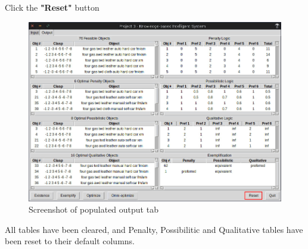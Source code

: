 \documentclass[12pt]{report}
\begin{document}
\begin{description}[leftmargin=4em]
\item [Step 1:]  Click the \textbf{"Reset"} button
\end{description}
\begin{figure}[H]
\begin{center}
\includegraphics[scale=0.3,trim=1cm 1cm 1cm 1cm]{reset}
\caption{Screenshot of populated output tab}
\end{center}
\end{figure}
\vspace{-2.5em}
\begin{description}[leftmargin=4em]
\item [Result:] All tables have been cleared, and Penalty, Possibilitic and Qualitative tables have been reset to their default columns.
\end{description}
\end{document}
